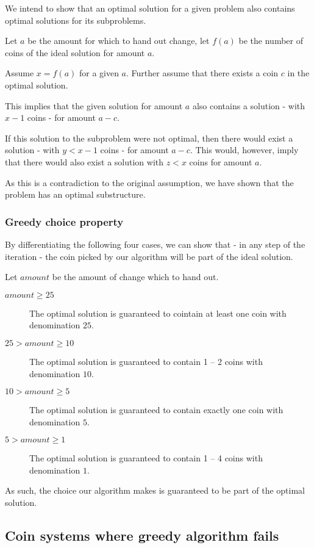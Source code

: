 \documentclass[a4paper]{scrartcl}
\begin{document}
We intend to show that an optimal solution for a given problem also contains
optimal solutions for its subproblems.

Let $a$ be the amount for which to hand out change, let $f(a)$ be the number of coins
of the ideal solution for amount $a$.

Assume $x = f(a)$ for a given $a$. Further assume that there exists a coin $c$
in the optimal solution.

This implies that the given solution for amount $a$ also contains a solution -
with $x - 1$ coins - for amount $a - c$.

If this solution to the subproblem were not optimal, then there would exist a
solution - with $y < x - 1$ coins - for amount $a - c$. This would, however,
imply that there would also exist a solution with $z < x$ coins for amount $a$.

As this is a contradiction to the original assumption, we have shown that the
problem has an optimal substructure.

\subsubsection{Greedy choice property}

By differentiating the following four cases, we can show that - in any step of
the iteration - the coin picked by our algorithm will be part of the ideal
solution.

Let $amount$ be the amount of change which to hand out.

\begin{description}
	\item[$amount \geq 25$] The optimal solution is guaranteed to cointain at least one coin with denomination $25$.
	\item[$25 > amount \geq 10$] The optimal solution is guaranteed to contain 1 -- 2 coins with denomination $10$.
	\item[$10 > amount \geq 5$] The optimal solution is guaranteed to contain exactly one coin with denomination $5$.
	\item[$5 > amount \geq 1$] The optimal solution is guaranteed to contain 1 -- 4 coins with denomination $1$.
\end{description}

As such, the choice our algorithm makes is guaranteed to be part of the optimal
solution.

\subsection{Coin systems where greedy algorithm fails}
\end{document}

